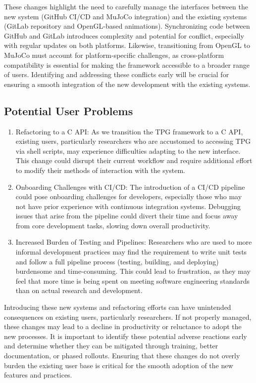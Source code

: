 \documentclass[12pt]{article}
\begin{document}
These changes highlight the need to carefully manage the interfaces between the new system (GitHub CI/CD and MuJoCo integration) and the existing systems (GitLab repository and OpenGL-based animations). Synchronizing code between GitHub and GitLab introduces complexity and potential for conflict, especially with regular updates on both platforms. Likewise, transitioning from OpenGL to MuJoCo must account for platform-specific challenges, as cross-platform compatibility is essential for making the framework accessible to a broader range of users. Identifying and addressing these conflicts early will be crucial for ensuring a smooth integration of the new development with the existing systems.

\subsection{Potential User Problems}

\begin{enumerate}
  \item Refactoring to a C API: As we transition the TPG framework to a C API, existing users, particularly researchers who are accustomed to accessing TPG via shell scripts, may experience difficulties adapting to the new interface. This change could disrupt their current workflow and require additional effort to modify their methods of interaction with the system.
  \item Onboarding Challenges with CI/CD: The introduction of a CI/CD pipeline could pose onboarding challenges for developers, especially those who may not have prior experience with continuous integration systems. Debugging issues that arise from the pipeline could divert their time and focus away from core development tasks, slowing down overall productivity.
  \item Increased Burden of Testing and Pipelines: Researchers who are used to more informal development practices may find the requirement to write unit tests and follow a full pipeline process (testing, building, and deploying) burdensome and time-consuming. This could lead to frustration, as they may feel that more time is being spent on meeting software engineering standards than on actual research and development.
\end{enumerate}

Introducing these new systems and refactoring efforts can have unintended consequences on existing users, particularly researchers. If not properly managed, these changes may lead to a decline in productivity or reluctance to adopt the new processes. It is important to identify these potential adverse reactions early and determine whether they can be mitigated through training, better documentation, or phased rollouts. Ensuring that these changes do not overly burden the existing user base is critical for the smooth adoption of the new features and practices.
\end{document}
